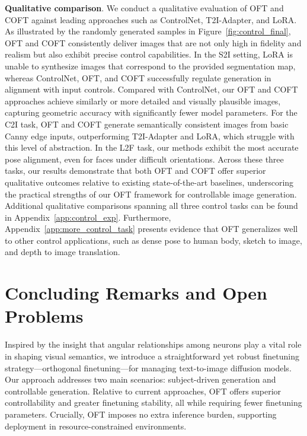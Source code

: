 \textbf{Qualitative comparison}. We conduct a qualitative evaluation of OFT and COFT against leading approaches such as ControlNet, T2I-Adapter, and LoRA. As illustrated by the randomly generated samples in Figure~\ref{fig:control_final}, OFT and COFT consistently deliver images that are not only high in fidelity and realism but also exhibit precise control capabilities. In the S2I setting, LoRA is unable to synthesize images that correspond to the provided segmentation map, whereas ControlNet, OFT, and COFT successfully regulate generation in alignment with input controls. Compared with ControlNet, our OFT and COFT approaches achieve similarly or more detailed and visually plausible images, capturing geometric accuracy with significantly fewer model parameters. For the C2I task, OFT and COFT generate semantically consistent images from basic Canny edge inputs, outperforming T2I-Adapter and LoRA, which struggle with this level of abstraction. In the L2F task, our methods exhibit the most accurate pose alignment, even for faces under difficult orientations. Across these three tasks, our results demonstrate that both OFT and COFT offer superior qualitative outcomes relative to existing state-of-the-art baselines, underscoring the practical strengths of our OFT framework for controllable image generation. Additional qualitative comparisons spanning all three control tasks can be found in Appendix~\ref{app:control_exp}. Furthermore, Appendix~\ref{app:more_control_task} presents evidence that OFT generalizes well to other control applications, such as dense pose to human body, sketch to image, and depth to image translation.

\section{Concluding Remarks and Open Problems}

Inspired by the insight that angular relationships among neurons play a vital role in shaping visual semantics, we introduce a straightforward yet robust finetuning strategy—orthogonal finetuning—for managing text-to-image diffusion models. Our approach addresses two main scenarios: subject-driven generation and controllable generation. Relative to current approaches, OFT offers superior controllability and greater finetuning stability, all while requiring fewer finetuning parameters. Crucially, OFT imposes no extra inference burden, supporting deployment in resource-constrained environments.

